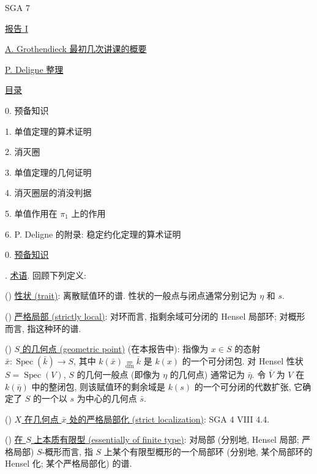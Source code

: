 

SGA 7

\underline{报告 I}

\underline{A. Grothendieck 最初几次讲课的概要}

\underline{P. Deligne 整理}

\underline{目录}

0. 预备知识

1. 单值定理的算术证明

2. 消灭圈

3. 单值定理的几何证明

4. 消灭圈层的消没判据

5. 单值作用在 $\pi_1$ 上的作用

6. P. Deligne 的附录: 稳定约化定理的算术证明

0. \underline{预备知识}

. \underline{术语}. 回顾下列定义:

() \underline{性状 (trait)}: 离散赋值环的谱. 性状的一般点与闭点通常分别记为 $\eta$ 和 $s$.

() \underline{严格局部 (strictly local)}: 对环而言, 指剩余域可分闭的 Hensel 局部环; 对概形而言, 指这种环的谱.

() \underline{$S$ 的几何点 (geometric point)} (在本报告中): 指像为 $x\in S$ 的态射 $\bar{x}:\operatorname{Spec}(\bar{k})\longrightarrow S$, 其中 $k(\bar{x})\underset{\mathrm{dfn}}{=}\bar{k}$ 是 $k(x)$ 的一个可分闭包. 对 Hensel 性状 $S=\operatorname{Spec}(V)$, $S$ 的几何一般点 (即像为 $\eta$ 的几何点) 通常记为 $\bar{\eta}$. 令 $\bar{V}$ 为 $V$ 在 $k(\bar{\eta})$ 中的整闭包, 则该赋值环的剩余域是 $k(s)$ 的一个可分闭的代数扩张, 它确定了 $S$ 的一个以 $s$ 为中心的几何点 $\bar{s}$.


() \underline{$X$ 在几何点 $\bar{x}$ 处的严格局部化 (strict localization)}: SGA 4 VIII 4.4.

() \underline{在 $S$ 上本质有限型 (essentially of finite type)}: 对局部 (分别地, Hensel 局部; 严格局部) $S$-概形而言, 指 $S$ 上某个有限型概形的一个局部环 (分别地, 某个局部环的 Hensel 化; 某个严格局部化) 的谱.

